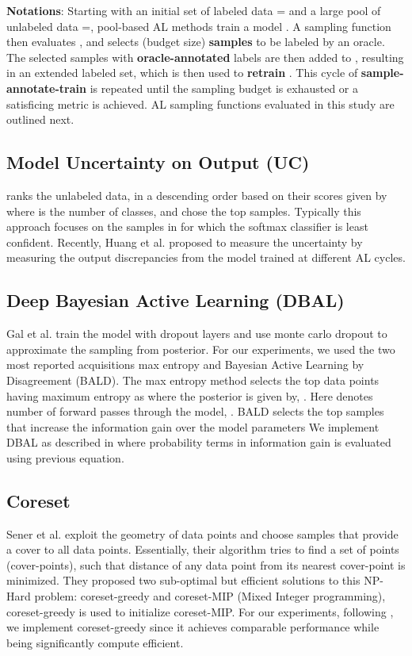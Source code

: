 \documentclass[10pt,twocolumn,letterpaper]{article}
\begin{document}
\textbf{Notations}: Starting with an initial set of labeled data = and a large pool of unlabeled data =, pool-based AL methods train a model . A sampling function  then evaluates , and selects  (budget size) \textbf{samples} to be labeled by an oracle. The selected samples with \textbf{oracle-annotated} labels are then added to , resulting in an extended  labeled set, which is then used to \textbf{retrain} . This cycle of \textbf{sample-annotate-train} is repeated until the sampling budget is exhausted or a satisficing metric is achieved. AL sampling functions evaluated in this study are outlined next. 


\subsection{Model Uncertainty on Output (UC)}
\cite{uncertainty_lewis1994sequential} ranks the unlabeled data,  in a descending order based on their scores given by 
where  is the number of classes, and chose the top  samples. Typically this approach focuses on the samples in  for which the softmax classifier is least confident. Recently, Huang et al.\cite{tod_huang2021semi} proposed to measure the uncertainty by measuring the output discrepancies from the model trained at different AL cycles.

\subsection{Deep Bayesian Active Learning (DBAL)}

Gal et al. \cite{DBAL_gal2017deep} train the model  with dropout layers and use monte carlo dropout to approximate the sampling from posterior.  
For our experiments, we used the two most reported acquisitions \ie  max entropy and Bayesian Active Learning by Disagreement (BALD). The max entropy method selects the top  data points having maximum entropy as 
where the posterior is given by, 
.
Here  denotes number of forward passes through the model, . 
BALD selects the top  samples that increase the information gain over the model parameters \ie 
We implement DBAL as described in \cite{DBAL_gal2017deep} where probability terms in information gain is evaluated using previous equation. 



\subsection{Coreset}
Sener et al.\cite{coreset_sener2018active} exploit the geometry of data points and choose samples that provide a cover to all data points. Essentially, their algorithm tries to find a set of points (cover-points), such that distance of any data point from its nearest cover-point is minimized. They proposed two sub-optimal but efficient solutions to this NP-Hard problem: coreset-greedy and coreset-MIP (Mixed Integer programming), coreset-greedy is used to initialize coreset-MIP. For our experiments, following \cite{yoo2019learning_loss_for_AL}, we implement coreset-greedy since it achieves comparable performance while being significantly compute efficient. 
\end{document}
